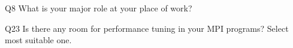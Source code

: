 \begin{description}%
\item{Q8} What is your major role at your place of work?%
\item{Q23} Is there any room for performance tuning in your MPI programs? Select most suitable one.%
\end{description}%
